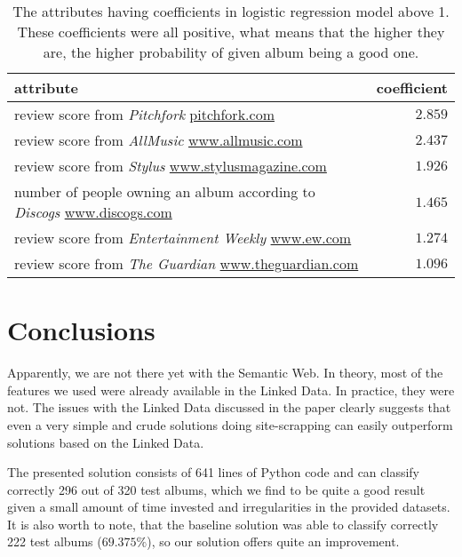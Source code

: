 \documentclass{llncs}
\begin{document}
\begin{table}
\caption{The attributes having coefficients in logistic regression model above 1.
These coefficients were all positive, what means that the higher they are, the higher probability of given album being a good one.
\label{tab:best_attrs}
}
\begin{tabular}{l|r}
attribute & coefficient \\
\hline
review score from \emph{Pitchfork} \url{pitchfork.com} & $2.859$ \\
review score from \emph{AllMusic} \url{www.allmusic.com} & $2.437$ \\
review score from \emph{Stylus} \url{www.stylusmagazine.com} & $1.926$ \\ %
number of people owning an album according to \emph{Discogs} \url{www.discogs.com} & $1.465$ \\
review score from \emph{Entertainment Weekly} \url{www.ew.com} & $1.274$ \\ %
review score from \emph{The Guardian} \url{www.theguardian.com} & $1.096$ \\ %
\end{tabular}
\end{table}

\section{Conclusions\label{sec:concl}}

Apparently, we are not there yet with the Semantic Web.
In theory, most of the features we used were already available in the Linked Data.
In practice, they were not.
The issues with the Linked Data discussed in the paper clearly suggests that even a very simple and crude solutions doing site-scrapping can easily outperform solutions based on the Linked Data.

The presented solution consists of 641 lines of Python code and can classify correctly 296 out of 320 test albums, which we find to be quite a good result given a small amount of time invested and irregularities in the provided datasets.
It is also worth to note, that the baseline solution was able to classify correctly 222 test albums ($69.375\%$), so our solution offers quite an improvement.



\end{document}
